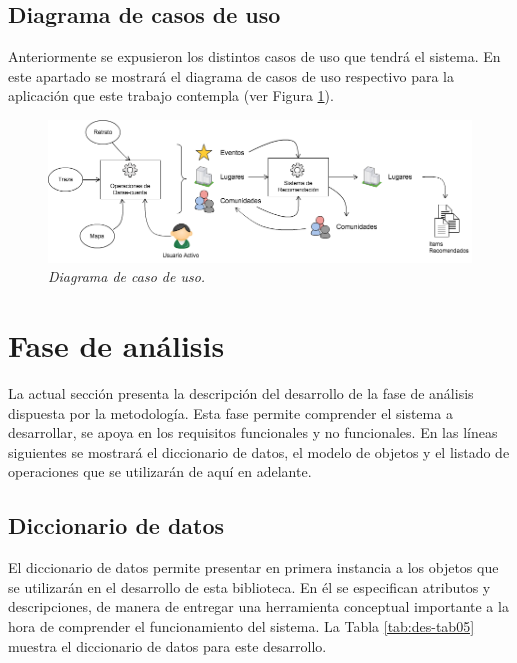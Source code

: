 \subsection{Diagrama de casos de uso}

Anteriormente se expusieron los distintos casos de uso que tendrá el sistema. En este apartado se mostrará el diagrama de casos de uso respectivo para la aplicación que este trabajo contempla (ver Figura \ref{fig:des-im1}).

\begin{figure}[H]
	\centering
	\includegraphics[scale=.15]{images/Figura5-1}
	\caption{\em Diagrama de caso de uso.}
	\label{fig:des-im1}
\end{figure}

\section{Fase de análisis}

La actual sección presenta la descripción del desarrollo de la fase de análisis dispuesta por la metodología. Esta fase permite comprender el sistema a desarrollar, se apoya en los requisitos funcionales y no funcionales.
En las líneas siguientes se mostrará el diccionario de datos, el modelo de objetos y el listado de operaciones que se utilizarán de aquí en adelante.

\subsection{Diccionario de datos}

El diccionario de datos permite presentar en primera instancia a los objetos que se utilizarán en el desarrollo de esta biblioteca. En él se especifican atributos y descripciones, de manera de entregar una herramienta conceptual importante a la hora de comprender el funcionamiento del sistema. La Tabla \ref{tab:des-tab05} muestra el diccionario de datos para este desarrollo.


